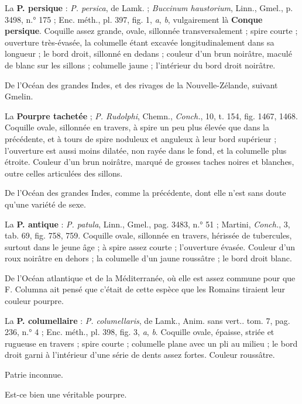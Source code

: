 \documentclass[a4paper, 11pt, oneside, polutonikogreek, french]{article}
\begin{document}
La \textbf{P. persique} : \emph{P. persica}, de Lamk. ; \emph{Buccinum haustorium}, Linn., Gmel., p. 3498, n.° 175 ; Enc. méth., pl. 397, fig. 1, \emph{a}, \emph{b}, vulgairement là \textbf{Conque persique}. Coquille assez grande, ovale, sillonnée transversalement ; spire courte ; ouverture très-évasée, la columelle étant excavée longitudinalement dans sa longueur ; le bord droit, sillonné en dedans ; couleur d'un brun noirâtre, maculé de blanc sur les sillons ; columelle jaune ; l'intérieur du bord droit noirâtre.

De l'Océan des grandes Indes, et des rivages de la Nouvelle-Zélande, suivant Gmelin.

\bigskip

La \textbf{Pourpre tachetée} ; \emph{P. Rudolphi}, Chemn., \emph{Conch.}, 10, t. 154, fig. 1467, 1468. Coquille ovale, sillonnée en travers, à spire un peu plus élevée que dans la précédente, et à tours de spire noduleux et anguleux à leur bord supérieur ; l'ouverture est aussi moins dilatée, non rayée dans le fond, et la columelle plus étroite. Couleur d'un brun noirâtre, marqué de grosses taches noires et blanches, outre celles articulées des sillons.

De l'Océan des grandes Indes, comme la précédente, dont elle n'est sans doute qu'une variété de sexe.

\bigskip

La \textbf{P. antique} : \emph{P. patula}, Linn., Gmel., pag. 3483, n.° 51 ; Martini, \emph{Conch.}, 3, tab. 69, fig. 758, 759. Coquille ovale, sillonnée en travers, hérissée de tubercules, surtout dans le jeune âge ; à spire assez courte ; l'ouverture évasée. Couleur d'un roux noirâtre en dehors ; la columelle d'un jaune roussâtre ; le bord droit blanc.

De l'Océan atlantique et de la Méditerranée, où elle est assez commune pour que F. Columna ait pensé que c'était de cette espèce que les Romains tiraient leur couleur pourpre.

\bigskip

La \textbf{P. columellaire} : \emph{P. columellaris}, de Lamk., Anim. sans vert.. tom. 7, pag. 236, n.° 4 ; Enc. méth., pl. 398, fig. 3, \emph{a}, \emph{b}. Coquille ovale, épaisse, striée et rugueuse en travers ; spire courte ; columelle plane avec un pli au milieu ; le bord droit garni à l'intérieur d'une série de dents assez fortes. Couleur roussâtre.

Patrie inconnue.

Est-ce bien une véritable pourpre.
\end{document}

